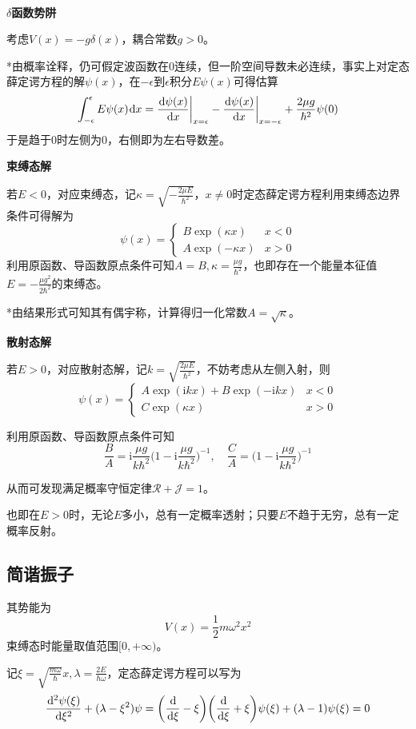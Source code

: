 \documentclass[a4paper,UTF8,fontset=windows]{ctexart}
\newcommand*{\dr}{\hspace{0.07em}\mathrm{d}}
\newcommand*{\ir}{\mathrm{i}}
\begin{document}
\

$\delta$\textbf{函数势阱}

考虑$V(x)=-g\delta(x)$，耦合常数$g>0$。

*由概率诠释，仍可假定波函数在0连续，但一阶空间导数未必连续，事实上对定态薛定谔方程的解$\psi(x)$，在$-\epsilon$到$\epsilon$积分$E\psi(x)$可得估算
$$\int_{-\epsilon}^\epsilon E\psi(x)\dr x=\frac{\dr\psi(x)}{\dr x}\bigg|_{x=\epsilon}-\frac{\dr\psi(x)}{\dr x}\bigg|_{x=-\epsilon}+\frac{2\mu g}{\hbar^2}\psi(0)$$
于是趋于0时左侧为0，右侧即为左右导数差。

\textbf{束缚态解}

若$E<0$，对应束缚态，记$\kappa=\sqrt{-\frac{2\mu E}{\hbar^2}}$，$x\ne0$时定态薛定谔方程利用束缚态边界条件可得解为
$$\psi(x)=\begin{cases}B\exp(\kappa x)&x<0\\A\exp(-\kappa x)&x>0\end{cases}$$
利用原函数、导函数原点条件可知$A=B,\kappa=\frac{\mu g}{\hbar^2}$，也即存在一个能量本征值$E=-\frac{\mu g^2}{2\hbar^2}$的束缚态。

*由结果形式可知其有偶宇称，计算得归一化常数$A=\sqrt{\kappa}$。

\textbf{散射态解}

若$E>0$，对应散射态解，记$k=\sqrt{\frac{2\mu E}{\hbar^2}}$，不妨考虑从左侧入射，则
$$\psi(x)=\begin{cases}A\exp(\ir kx)+B\exp(-\ir kx)&x<0\\C\exp(\kappa x)&x>0\end{cases}$$

利用原函数、导函数原点条件可知
$$\frac{B}{A}=\ir\frac{\mu g}{k\hbar^2}\bigg(1-\ir\frac{\mu g}{k\hbar^2}\bigg)^{-1},\quad\frac{C}{A}=\bigg(1-\ir\frac{\mu g}{k\hbar^2}\bigg)^{-1}$$

从而可发现满足概率守恒定律$\mathcal{R}+\mathcal{J}=1$。

也即在$E>0$时，无论$E$多小，总有一定概率透射；只要$E$不趋于无穷，总有一定概率反射。

\subsection{简谐振子}
其势能为
$$V(x)=\frac{1}{2}m\omega^2x^2$$
束缚态时能量取值范围$[0,+\infty)$。

记$\xi=\sqrt{\frac{m\omega}{\hbar}}x,\lambda=\frac{2E}{\hbar\omega}$，定态薛定谔方程可以写为
$$\frac{\dr^2\psi(\xi)}{\dr\xi^2}+(\lambda-\xi^2)\psi=\bigg(\frac{\dr}{\dr\xi}-\xi\bigg)\bigg(\frac{\dr}{\dr\xi}+\xi\bigg)\psi(\xi)+(\lambda-1)\psi(\xi)=0$$
\end{document}
